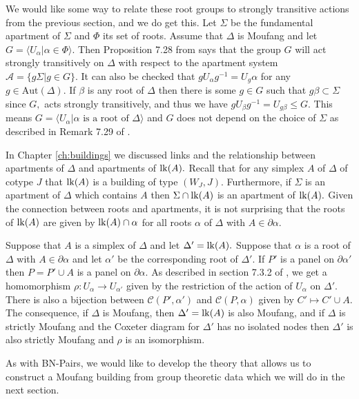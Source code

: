 \documentclass[class=book, crop=false,12 pt]{standalone}
\begin{document}
We would like some way to relate these root groups to strongly transitive actions from the previous section, and we do get this. Let $\Sigma$ be the fundamental apartment of $\Sigma$ and $\Phi$ its set of roots. Assume that $\Delta$ is Moufang and let $G=\langle U_\alpha|\alpha\in \Phi\rangle.$ Then Proposition 7.28 from \cite{buildings} says that the group $G$ will act strongly transitively on $\Delta$ with respect to the apartment system $\mathcal{A}=\{g\Sigma|g\in G\}.$ It can also be checked that $gU_\alpha g^{-1}=U_g\alpha$ for any $g\in \mathrm{Aut}(\Delta).$ If $\beta$ is any root of $\Delta$ then there is some $g\in G$ such that $g\beta\subset \Sigma$ since $G,$ acts strongly transitively, and thus we have $gU_\beta g^{-1}=U_{g\beta}\le G.$ This means $G=\langle U_{\alpha}|\alpha \text{ is a root of }\Delta\rangle$ and $G$ does not depend on the choice of $\Sigma$ as described in Remark 7.29 of \cite{buildings}.

In Chapter \ref{ch:buildings} we discussed links and the relationship between apartments of $\Delta$ and apartments of $\mathrm{lk}(A).$ Recall that for any simplex $A$ of $\Delta$ of cotype $J$ that $\mathrm{lk}(A)$ is a building of type $(W_J,J).$ Furthermore, if $\Sigma$ is an apartment of $\Delta$ which contains $A$ then $\Sigma\cap \mathrm{lk}(A)$ is an apartment of $\mathrm{lk}(A).$ Given the connection between roots and apartments, it is not surprising that the roots of $\mathrm{lk}(A)$ are given by $\mathrm{lk}(A)\cap \alpha$ for all roots $\alpha$ of $\Delta$ with $A\in \partial \alpha.$

Suppose that $A$ is a simplex of $\Delta$ and let $\Delta'=\mathrm{lk}(A).$ Suppose that $\alpha$ is a root of $\Delta$ with $A\in \partial \alpha$ and let $\alpha'$ be the corresponding root of $\Delta'.$ If $P'$ is a panel on $\partial \alpha'$ then $P=P'\cup A$ is a panel on $\partial \alpha.$ As described in section 7.3.2 of \cite{buildings}, we get a homomorphism $\rho:U_\alpha \to U_{\alpha'}$ given by the restriction of the action of $U_{\alpha}$ on $\Delta'.$ There is also a bijection between $\mathcal{C}(P',\alpha')$ and $\mathcal{C}(P,\alpha)$ given by $C'\mapsto C'\cup A.$ The consequence, if $\Delta$ is Moufang, then $\Delta'=\mathrm{lk}(A)$ is also Moufang, and if $\Delta$ is strictly Moufang and the Coxeter diagram for $\Delta'$ has no isolated nodes then $\Delta'$ is also strictly Moufang and $\rho$ is an isomorphism. 

As with BN-Pairs, we would like to develop the theory that allows us to construct a Moufang building from group theoretic data which we will do in the next section.
\end{document}
